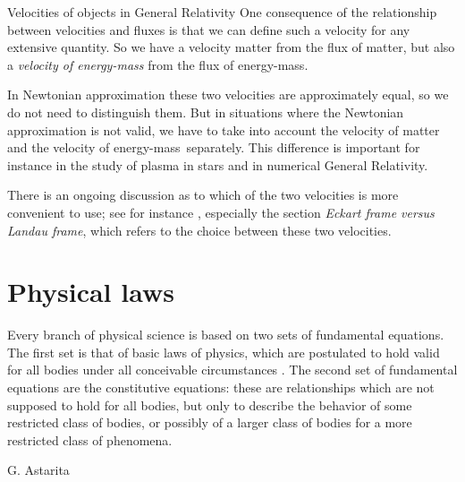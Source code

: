 \documentclass[a4paper,12pt,%
onecolumn,oneside,%
british%
]{memoir}
\newcommand*{\incr}{\Delta}%
\renewcommand*{\|}[1][]{\nonscript\:#1\vert\nonscript\:\mathopen{}}
\newcommand*{\energym}{energy-mass}
\begin{document}
\begin{extra}{Velocities of objects in General Relativity}
  One consequence of the relationship between velocities and fluxes is that we can define such a velocity for any extensive quantity. So we have a velocity matter from the flux of matter, but also a \emph{velocity of \energym} from the flux of \energym.

  \smallskip

  In Newtonian approximation these two velocities are approximately equal, so we do not need to distinguish them. But in situations where the Newtonian approximation is not valid, we have to take into account the velocity of matter and the velocity of \energym\ separately. This difference is important for instance in the study of plasma in stars and in numerical General Relativity.

  \smallskip

  There is an ongoing discussion as to which of the two velocities is more convenient to use; see for instance \cites{kandusetal2008}, especially the section \emph{Eckart frame versus Landau frame}, which refers to the choice between these two velocities.
\end{extra}



\printpagenotes*
\clearpage
\chapter{Physical laws}
\label{cha:laws}


\epigraph{Every branch of physical science is based on two sets of fundamental equations. The first set is that of basic laws of physics, which are postulated to hold valid for all bodies under all conceivable circumstances \textelp{}. The second set of fundamental equations are the constitutive equations: these are relationships which are not supposed to hold for all bodies, but only to describe the behavior of some restricted class of bodies, or possibly of a larger class of bodies for a more restricted class of phenomena.}{G. Astarita \cites*{astarita1989_r1990}}
\end{document}
